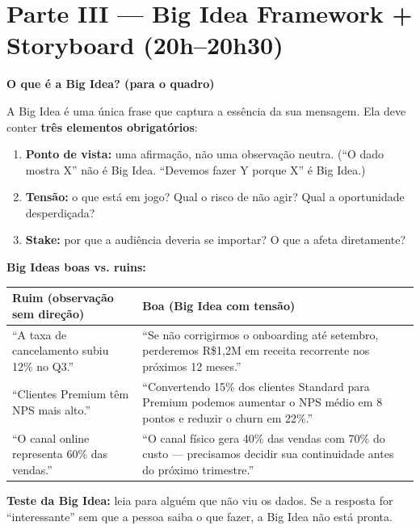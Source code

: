\section{Parte III — Big Idea Framework + Storyboard (20h–20h30)}

\begin{BoardBox}
\textbf{O que é a Big Idea? (para o quadro)}

A Big Idea é uma única frase que captura a essência da sua mensagem.
Ela deve conter \textbf{três elementos obrigatórios}:

\begin{enumerate}
  \item \textbf{Ponto de vista:} uma afirmação, não uma observação neutra.
  (``O dado mostra X'' não é Big Idea. ``Devemos fazer Y porque X'' é
  Big Idea.)
  \item \textbf{Tensão:} o que está em jogo? Qual o risco de não agir?
  Qual a oportunidade desperdiçada?
  \item \textbf{Stake:} por que a audiência deveria se importar? O que a
  afeta diretamente?
\end{enumerate}
\end{BoardBox}

\begin{SolvedBox}
\textbf{Big Ideas boas vs. ruins:}

\begin{tabular}{|p{6cm}|p{7cm}|}
\hline
\textbf{Ruim (observação sem direção)} & \textbf{Boa (Big Idea com tensão)} \\
\hline
``A taxa de cancelamento subiu 12\% no Q3.'' &
``Se não corrigirmos o onboarding até setembro, perderemos R\$1,2M em receita
recorrente nos próximos 12 meses.'' \\
\hline
``Clientes Premium têm NPS mais alto.'' &
``Convertendo 15\% dos clientes Standard para Premium podemos aumentar o NPS
médio em 8 pontos e reduzir o churn em 22\%.'' \\
\hline
``O canal online representa 60\% das vendas.'' &
``O canal físico gera 40\% das vendas com 70\% do custo — precisamos decidir
sua continuidade antes do próximo trimestre.'' \\
\hline
\end{tabular}

\textbf{Teste da Big Idea:} leia para alguém que não viu os dados.
Se a resposta for ``interessante'' sem que a pessoa saiba o que fazer,
a Big Idea não está pronta.
\end{SolvedBox}

